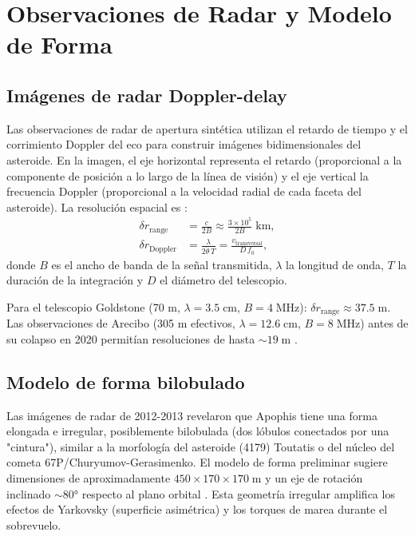 \documentclass[a4paper]{article}
\begin{document}
\section{Observaciones de Radar y Modelo de Forma}

\subsection{Imágenes de radar Doppler-delay}

Las observaciones de radar de apertura sintética utilizan el retardo de tiempo y el corrimiento Doppler del eco para construir imágenes bidimensionales del asteroide. En la imagen, el eje horizontal representa el retardo (proporcional a la componente de posición a lo largo de la línea de visión) y el eje vertical la frecuencia Doppler (proporcional a la velocidad radial de cada faceta del asteroide). La resolución espacial es \cite{brozovic2018radar}:
\begin{align}
  \delta r_\text{range} &= \frac{c}{2B} \approx \frac{3\times10^5}{2B}\;\text{km}, \\
  \delta r_\text{Doppler} &= \frac{\lambda}{2\dot{\theta}\,T} = \frac{v_\text{transversal}}{D\,f_0},
\end{align}
donde $B$ es el ancho de banda de la señal transmitida, $\lambda$ la longitud de onda, $T$ la duración de la integración y $D$ el diámetro del telescopio.

Para el telescopio Goldstone (70 m, $\lambda = 3.5\;\text{cm}$, $B = 4\;\text{MHz}$): $\delta r_\text{range} \approx 37.5\;\text{m}$. Las observaciones de Arecibo (305 m efectivos, $\lambda = 12.6\;\text{cm}$, $B = 8\;\text{MHz}$) antes de su colapso en 2020 permitían resoluciones de hasta $\sim 19\;\text{m}$ \cite{brozovic2018radar, vallejo2022conditions}.

\subsection{Modelo de forma bilobulado}

Las imágenes de radar de 2012-2013 revelaron que Apophis tiene una forma elongada e irregular, posiblemente bilobulada (dos lóbulos conectados por una "cintura"), similar a la morfología del asteroide (4179) Toutatis o del núcleo del cometa 67P/Churyumov-Gerasimenko. El modelo de forma preliminar sugiere dimensiones de aproximadamente $450\times170\times170\;\text{m}$ y un eje de rotación inclinado $\sim 80°$ respecto al plano orbital \cite{brozovic2018radar, nasa2025apophisfacts}. Esta geometría irregular amplifica los efectos de Yarkovsky (superficie asimétrica) y los torques de marea durante el sobrevuelo.
\end{document}
